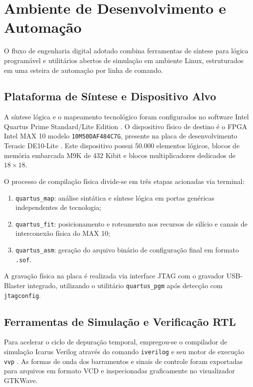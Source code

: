 \section{Ambiente de Desenvolvimento e Automação}

O fluxo de engenharia digital adotado combina ferramentas de síntese para lógica programável e utilitários abertos de simulação em ambiente Linux, estruturados em uma esteira de automação por linha de comando.

\subsection{Plataforma de Síntese e Dispositivo Alvo}
A síntese lógica e o mapeamento tecnológico foram configurados no software Intel Quartus Prime Standard/Lite Edition \cite{intel_quartus_handbook}. O dispositivo físico de destino é o FPGA Intel MAX 10 modelo \texttt{10M50DAF484C7G}, presente na placa de desenvolvimento Terasic DE10-Lite \cite{terasic_de10_lite_user_manual}. Este dispositivo possui 50.000 elementos lógicos, blocos de memória embarcada M9K de 432 Kibit e blocos multiplicadores dedicados de $18\times18$.

O processo de compilação física divide-se em três etapas acionadas via terminal:
\begin{enumerate}
    \item \texttt{quartus\_map}: análise sintática e síntese lógica em portas genéricas independentes de tecnologia;
    \item \texttt{quartus\_fit}: posicionamento e roteamento nos recursos de silício e canais de interconexão física do MAX 10;
    \item \texttt{quartus\_asm}: geração do arquivo binário de configuração final em formato \texttt{.sof}.
\end{enumerate}

A gravação física na placa é realizada via interface JTAG com o gravador USB-Blaster integrado, utilizando o utilitário \texttt{quartus\_pgm} após detecção com \texttt{jtagconfig}.

\subsection{Ferramentas de Simulação e Verificação RTL}
Para acelerar o ciclo de depuração temporal, empregou-se o compilador de simulação Icarus Verilog através do comando \texttt{iverilog} e seu motor de execução \texttt{vvp} \cite{icarus_verilog}. As formas de onda dos barramentos e sinais de controle foram exportadas para arquivos em formato VCD e inspecionadas graficamente no visualizador GTKWave.

